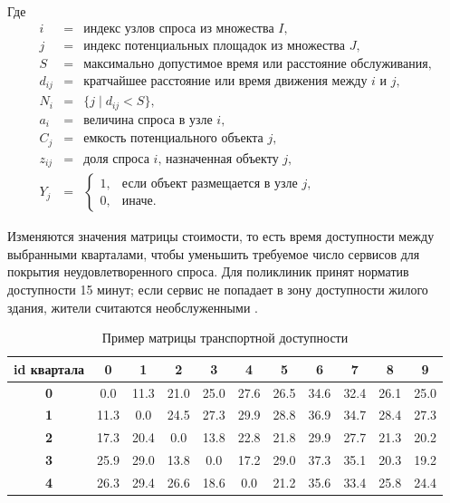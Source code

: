Где
\[
\begin{array}{rcl}
i & = & \text{индекс узлов спроса из множества } I, \\
j & = & \text{индекс потенциальных площадок из множества } J, \\
S & = & \text{максимально допустимое время или расстояние обслуживания}, \\
d_{ij} & = & \text{кратчайшее расстояние или время движения между } i \text{ и } j, \\
N_i & = & \{j \mid d_{ij} < S\}, \\
a_i & = & \text{величина спроса в узле } i, \\
C_j & = & \text{емкость потенциального объекта } j, \\
z_{ij} & = & \text{доля спроса } i\text{, назначенная объекту } j, \\
Y_j & = &
\begin{cases}
1, & \text{если объект размещается в узле } j,\\
0, & \text{иначе}.
\end{cases}
\end{array}
\]

Изменяются значения матрицы стоимости, то есть время доступности между выбранными кварталами, чтобы уменьшить требуемое число сервисов для покрытия неудовлетворенного спроса. Для поликлиник принят норматив доступности 15 минут; если сервис не попадает в зону доступности жилого здания, жители считаются необслуженными \cite{kontsevik2024connectivityPlacement}.

\begin{table}[h]
    \centering
    \small
    \caption{Пример матрицы транспортной доступности}
    \label{tab:chapter3-tikhevich-toy-matrix}
    \begin{tabular}{c|cccccccccc}
        \textbf{id квартала} & \textbf{0} & \textbf{1} & \textbf{2} & \textbf{3} & \textbf{4} & \textbf{5} & \textbf{6} & \textbf{7} & \textbf{8} & \textbf{9} \\
        \hline
        \textbf{0} & 0.0 & 11.3 & \cellcolor{yellow!25}21.0 & \cellcolor{yellow!25}25.0 & 27.6 & 26.5 & 34.6 & 32.4 & 26.1 & \cellcolor{yellow!25}25.0 \\
        \textbf{1} & 11.3 & 0.0 & \cellcolor{yellow!25}24.5 & 27.3 & 29.9 & 28.8 & 36.9 & 34.7 & 28.4 & 27.3 \\
        \textbf{2} & \cellcolor{yellow!25}17.3 & \cellcolor{yellow!25}20.4 & 0.0 & 13.8 & \cellcolor{yellow!25}22.8 & \cellcolor{yellow!25}21.8 & 29.9 & 27.7 & \cellcolor{yellow!25}21.3 & \cellcolor{yellow!25}20.2 \\
        \textbf{3} & 25.9 & 29.0 & 13.8 & 0.0 & \cellcolor{yellow!25}17.2 & 29.0 & 37.3 & 35.1 & \cellcolor{yellow!25}20.3 & 19.2 \\
        \textbf{4} & 26.3 & 29.4 & 26.6 & \cellcolor{yellow!25}18.6 & 0.0 & \cellcolor{yellow!25}21.2 & 35.6 & 33.4 & 25.8 & \cellcolor{yellow!25}24.4
    \end{tabular}
\end{table}

